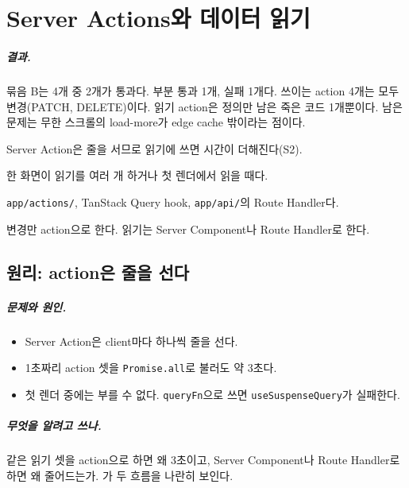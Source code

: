 \chapter{Server Actions와 데이터 읽기}\label{ch:actions}

\paragraph{결과.}
묶음 B는 4개 중 2개가 통과다. 부분 통과 1개, 실패 1개다.
쓰이는 action 4개는 모두 변경(PATCH, DELETE)이다. 읽기 action은 정의만 남은 죽은 코드 1개뿐이다.
남은 문제는 무한 스크롤의 load-more가 edge cache 밖이라는 점이다.

\begin{inbrief}
  \item[Why] Server Action은 줄을 서므로 읽기에 쓰면 시간이 더해진다(S2).
  \item[When] 한 화면이 읽기를 여러 개 하거나 첫 렌더에서 읽을 때다.
  \item[Where] \texttt{app/actions/}, TanStack Query hook, \texttt{app/api/}의 Route Handler다.
  \item[How] 변경만 action으로 한다. 읽기는 Server Component나 Route Handler로 한다.
\end{inbrief}

\section{원리: action은 줄을 선다}\label{sec:ac-principle}

\paragraph{문제와 원인.}
\begin{itemize}[nosep]
  \item Server Action은 client마다 하나씩 줄을 선다.
  \item 1초짜리 action 셋을 \texttt{Promise.all}로 불러도 약 3초다.
  \item 첫 렌더 중에는 부를 수 없다. \texttt{queryFn}으로 쓰면 \texttt{useSuspenseQuery}가 실패한다.
\end{itemize}

\paragraph{무엇을 알려고 쓰나.}
같은 읽기 셋을 action으로 하면 왜 3초이고, Server Component나 Route Handler로 하면 왜 줄어드는가.
가 두 흐름을 나란히 보인다.

